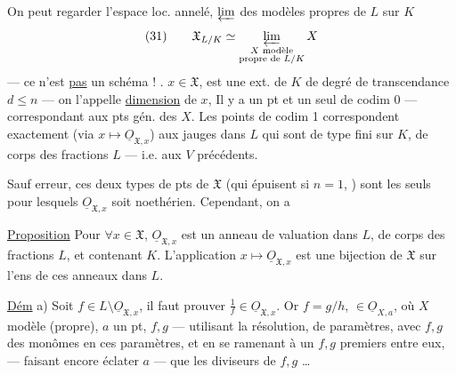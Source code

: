 On peut regarder l'espace loc. annelé, $\varprojlim$ des modèles  propres de $L$ sur $K$
\[
(31)\qquad\mathfrak X_{L/K}\simeq\varprojlim_{\substack{X\text{ modèle}\\\text{propre de }L/K}}X
\]
--- ce n'est \uline{pas} un schéma ! .  
$x\in\mathfrak X$,   est une ext. de $K$ de degré de transcendance $d\leq n$ --- on l'appelle \uline{dimension} de $x$,  Il y a un pt et un seul de codim 0 --- correspondant aux pts gén. des $X$. Les points de codim 1
correspondent exactement (via $x\longmapsto\underline{O}_{\mathfrak X,x}$) aux jauges dans $L$ qui sont  de type fini sur $K$, de corps des fractions $L$ --- i.e. aux $V$ précédents.

Sauf erreur, ces deux types de pts de $\mathfrak X$ (qui épuisent  si $n=1$, ) sont les seuls pour lesquels $\underline{O}_{\mathfrak X,x}$ soit noethérien. Cependant, on a

\margin{$\big|$}
\uline{Proposition} Pour $\forall x\in\mathfrak X$, $\underline{O}_{\mathfrak X,x}$ est un anneau de valuation dans $L$, de corps des fractions $L$, et contenant $K$. L'application $x\longmapsto\underline{O}_{\mathfrak X,x}$ est une bijection de $\mathfrak X$ sur l'ens de ces anneaux dans $L$.

\uline{Dém} a) Soit $f\in L\setminus\underline{O}_{\mathfrak X,x}$, il faut prouver $\frac1f\in\underline{O}_{\mathfrak X,x}$. Or $f=g/h$, $\in\underline{O}_{X,a}$, où $X$ modèle  (propre), $a$ un pt, $f,g$  --- utilisant la résolution,   de paramètres, avec $f,g$ des monômes
en ces paramètres, et en se ramenant à un $f,g$ premiers entre eux,  --- faisant encore éclater $a$ --- que les diviseurs de $f,g$  \ldots


